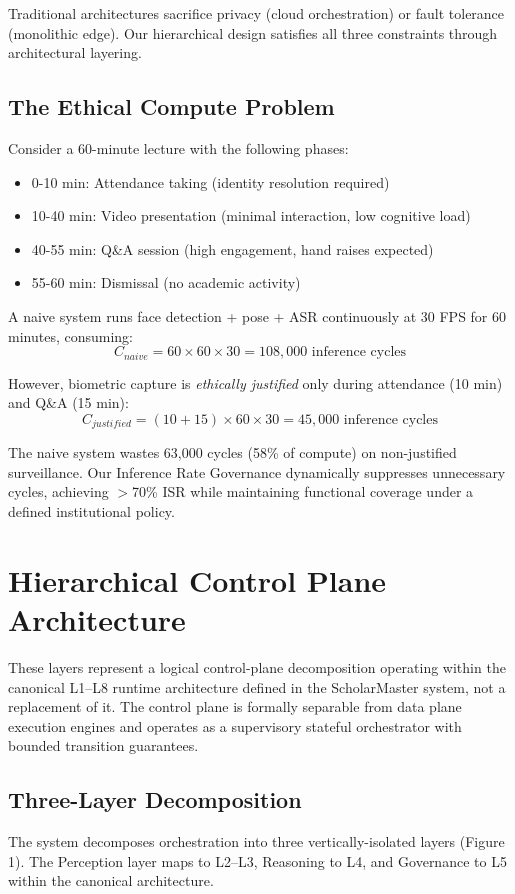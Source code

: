 \documentclass[conference]{IEEEtran}
\begin{document}
Traditional architectures sacrifice privacy (cloud orchestration) or fault tolerance (monolithic edge). Our hierarchical design satisfies all three constraints through architectural layering.

\subsection{The Ethical Compute Problem}
Consider a 60-minute lecture with the following phases:
\begin{itemize}
    \item 0-10 min: Attendance taking (identity resolution required)
    \item 10-40 min: Video presentation (minimal interaction, low cognitive load)
    \item 40-55 min: Q\&A session (high engagement, hand raises expected)
    \item 55-60 min: Dismissal (no academic activity)
\end{itemize}

A naive system runs face detection + pose + ASR continuously at 30 FPS for 60 minutes, consuming:
$$C_{naive} = 60 \times 60 \times 30 = 108,000 \text{ inference cycles}$$

However, biometric capture is \textit{ethically justified} only during attendance (10 min) and Q\&A (15 min):
$$C_{justified} = (10 + 15) \times 60 \times 30 = 45,000 \text{ inference cycles}$$

The naive system wastes 63,000 cycles (58\% of compute) on non-justified surveillance. Our Inference Rate Governance dynamically suppresses unnecessary cycles, achieving $>$70\% ISR while maintaining functional coverage under a defined institutional policy.

\section{Hierarchical Control Plane Architecture}

These layers represent a logical control-plane decomposition operating within the canonical L1--L8 runtime architecture defined in the ScholarMaster system, not a replacement of it. The control plane is formally separable from data plane execution engines and operates as a supervisory stateful orchestrator with bounded transition guarantees.

\subsection{Three-Layer Decomposition}
The system decomposes orchestration into three vertically-isolated layers (Figure 1). The Perception layer maps to L2--L3, Reasoning to L4, and Governance to L5 within the canonical architecture.
\end{document}
